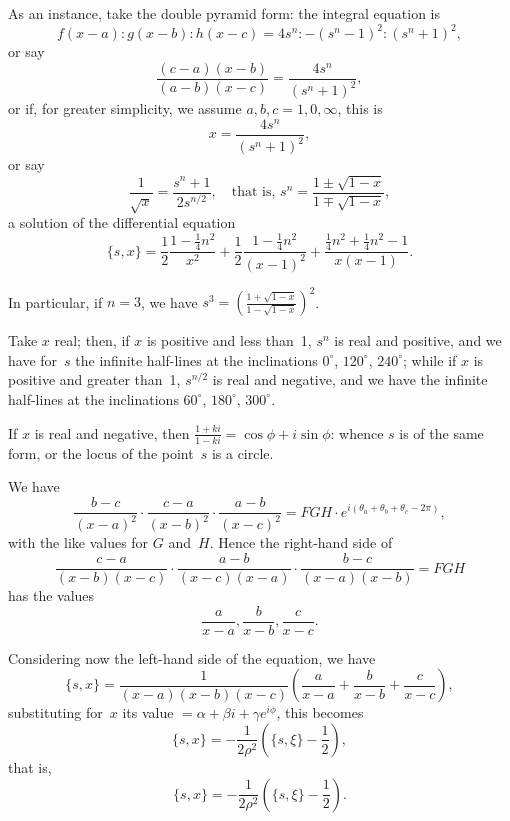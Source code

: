 \documentclass[11pt,a4paper]{book}
\begin{document}
\begin{art}
As an instance, take the double pyramid form: the integral equation is
\[
f(x-a) : g(x-b) : h(x-c) = 4s^n : -(s^n-1)^2 : (s^n+1)^2,
\]
or say
\[
\frac{(c-a)(x-b)}{(a-b)(x-c)} = \frac{4s^n}{(s^n+1)^2},
\]
or if, for greater simplicity, we assume $a, b, c = 1, 0, \infty$, this is
\[
x = \frac{4s^n}{(s^n+1)^2},
\]
or say
\[
\frac{1}{\sqrt{x}} = \frac{s^n+1}{2s^{n/2}}, \quad \text{that is, } s^n = \frac{1 \pm \sqrt{1-x}}{1 \mp \sqrt{1-x}},
\]
a solution of the differential equation
\[
\{s, x\} = \frac{1}{2}\frac{1-\frac{1}{4}n^2}{x^2} + \frac{1}{2}\frac{1-\frac{1}{4}n^2}{(x-1)^2} + \frac{\frac{1}{4}n^2 + \frac{1}{4}n^2 - 1}{x(x-1)}.
\]

In particular, if $n = 3$, we have $s^3 = \left(\frac{1+\sqrt{1-x}}{1-\sqrt{1-x}}\right)^2$.
\end{art}

\begin{art}
Take $x$ real; then, if $x$ is positive and less than~1, $s^n$ is real and
positive, and we have for~$s$ the infinite half-lines at the inclinations
$0^\circ$, $120^\circ$, $240^\circ$; while if $x$ is positive and greater than~1,
$s^{n/2}$ is real and negative, and we have the infinite half-lines at the
inclinations $60^\circ$, $180^\circ$, $300^\circ$.

If $x$ is real and negative, then $\frac{1+ki}{1-ki} = \cos\phi + i\sin\phi$: whence
$s$ is of the same form, or the locus of the point~$s$ is a circle.
\end{art}

\begin{art}
We have
\[
\frac{b-c}{(x-a)^2} \cdot \frac{c-a}{(x-b)^2} \cdot \frac{a-b}{(x-c)^2} = FGH \cdot e^{i(\theta_a + \theta_b + \theta_c - 2\pi)},
\]
with the like values for $G$ and~$H$. Hence the right-hand side of
\[
\frac{c-a}{(x-b)(x-c)} \cdot \frac{a-b}{(x-c)(x-a)} \cdot \frac{b-c}{(x-a)(x-b)} = FGH
\]
has the values
\[
\frac{a}{x-a}, \frac{b}{x-b}, \frac{c}{x-c}.
\]
\end{art}

\begin{art}
Considering now the left-hand side of the equation, we have
\[
\{s, x\} = \frac{1}{(x-a)(x-b)(x-c)} \left(\frac{a}{x-a} + \frac{b}{x-b} + \frac{c}{x-c}\right),
\]
substituting for~$x$ its value $= \alpha + \beta i + \gamma e^{i\phi}$, this becomes
\[
\{s, x\} = -\frac{1}{2\rho^2} \left(\{s, \xi\} - \frac{1}{2}\right),
\]
that is,
\[
\{s, x\} = -\frac{1}{2\rho^2} \left(\{s, \xi\} - \frac{1}{2}\right).
\]
\end{art}
\end{document}
